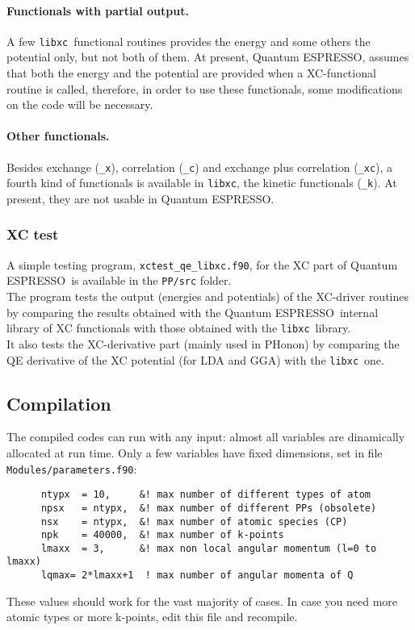 \documentclass[12pt,a4paper]{article}
\def\qe{{\sc Quantum ESPRESSO}}
\def\libxc{\texttt{libxc}}
\begin{document}
\paragraph{Functionals with partial output.}
A few \libxc\ functional routines provides the energy and some others the potential only, but not both of them. At present, \qe, assumes that both the energy and the potential are provided when a XC-functional routine is called, therefore, in order to use these functionals, some modifications on the code will be necessary.
%
\paragraph{Other functionals.} Besides exchange (\texttt{\_x}), correlation (\texttt{\_c}) and exchange plus correlation (\texttt{\_xc}), a fourth kind of functionals is available in \libxc, the kinetic functionals (\texttt{\_k}). At present, they are not usable in \qe.
%
\subsubsection{XC test}
A simple testing program, \texttt{xctest\_qe\_libxc.f90}, for the XC part of \qe\ is available in the \texttt{PP/src} folder.\\
The program tests the output (energies and potentials) of the XC-driver routines by comparing the results obtained with the \qe\ internal library of XC functionals with those obtained with the \libxc\ library.\\
It also tests the XC-derivative part (mainly used in PHonon) by comparing the QE derivative of the XC potential (for LDA and GGA) with the \libxc\ one.

\subsection{Compilation}
\label{SubSec:Compilation}

The compiled codes can run with any input: almost all variables are
dinamically allocated at run time. Only a few variables have fixed
dimensions, set in file \texttt{Modules/parameters.f90}:
\begin{verbatim}
      ntypx  = 10,     &! max number of different types of atom
      npsx   = ntypx,  &! max number of different PPs (obsolete)
      nsx    = ntypx,  &! max number of atomic species (CP)
      npk    = 40000,  &! max number of k-points
      lmaxx  = 3,      &! max non local angular momentum (l=0 to lmaxx)
      lqmax= 2*lmaxx+1  ! max number of angular momenta of Q
\end{verbatim}
These values should work for the vast majority of cases. In case you need
more atomic types or more k-points, edit this file and recompile.
\end{document}
